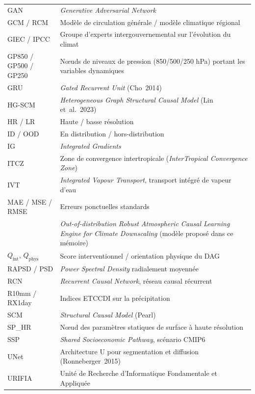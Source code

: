 \begin{longtable}{p{3.8cm} p{10.7cm}}
GAN & \emph{Generative Adversarial Network} \\[0.3em]
GCM / RCM & Modèle de circulation générale / modèle climatique régional \\[0.3em]
GIEC / IPCC & Groupe d'experts intergouvernemental sur l'évolution du climat \\[0.3em]
GP850 / GP500 / GP250 & Nœuds de niveaux de pression (850/500/250 hPa) portant les variables dynamiques \\[0.3em]
GRU & \emph{Gated Recurrent Unit} (Cho~2014) \\[0.3em]
HG-SCM & \emph{Heterogeneous Graph Structural Causal Model} (Lin et~al.~2023) \\[0.3em]
HR / LR & Haute / basse résolution \\[0.3em]
ID / OOD & En distribution / hors-distribution \\[0.3em]
IG & \emph{Integrated Gradients} \\[0.3em]
ITCZ & Zone de convergence intertropicale (\emph{InterTropical Convergence Zone}) \\[0.3em]
IVT & \emph{Integrated Vapour Transport}, transport intégré de vapeur d'eau \\[0.3em]
MAE / MSE / RMSE & Erreurs ponctuelles standards \\[0.3em]
\Oracle{} & \emph{Out-of-distribution Robust Atmospheric Causal Learning Engine for Climate Downscaling} (modèle proposé dans ce mémoire) \\[0.3em]
$Q_{\mathrm{int}}$, $Q_{\mathrm{phys}}$ & Score interventionnel / orientation physique du DAG \\[0.3em]
RAPSD / PSD & \emph{Power Spectral Density} radialement moyennée \\[0.3em]
RCN & \emph{Recurrent Causal Network}, réseau causal récurrent \\[0.3em]
R10mm / RX1day & Indices ETCCDI sur la précipitation \\[0.3em]
SCM & \emph{Structural Causal Model} (Pearl) \\[0.3em]
SP\_HR & Nœud des paramètres statiques de surface à haute résolution \\[0.3em]
SSP & \emph{Shared Socioeconomic Pathway}, scénario CMIP6 \\[0.3em]
UNet & Architecture U pour segmentation et diffusion (Ronneberger~2015) \\[0.3em]
URIFIA & Unité de Recherche d'Informatique Fondamentale et Appliquée \\
\end{longtable}
\addtocounter{table}{-1}
\endgroup
